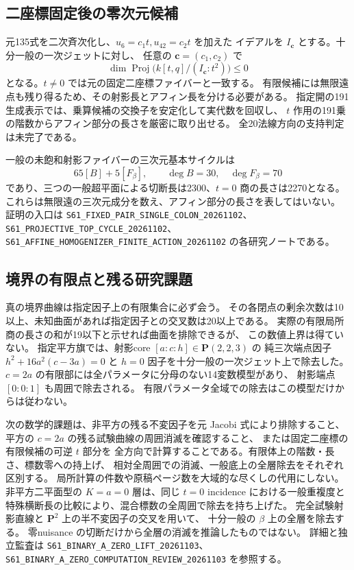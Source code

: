 \documentclass[11pt,a4paper]{ltjsarticle}
\theoremstyle{remark}\newtheorem{remark}[proposition]{注意}
\begin{document}
\subsection{二座標固定後の零次元候補}
元135式を二次斉次化し、$u_6=c_1t,u_{42}=c_2t$ を加えた
イデアルを $I_{\mathbf c}$ とする。十分一般の一次ジェットに対し、
任意の $\mathbf c=(c_1,c_2)$ で
\[
 \dim\operatorname{Proj}\bigl(k[t,q]/(I_{\mathbf c}:t^2)\bigr)\le0
\]
となる。$t\ne0$ では元の固定二座標ファイバーと一致する。
有限候補には無限遠点も残り得るため、その射影長とアフィン長を分ける必要がある。
指定開の191生成表示では、乗算候補の交換子を安定化して実代数を回収し、
$t$ 作用の191乗の階数からアフィン部分の長さを厳密に取り出せる。
全20法線方向の支持判定は未完了である。

一般の未飽和射影ファイバーの三次元基本サイクルは
\[
 65[B]+5[F_\beta],\qquad \deg B=30,\quad\deg F_\beta=70
\]
であり、三つの一般超平面による切断長は2300、$t=0$ 商の長さは2270となる。
これらは無限遠の三次元成分を数え、アフィン部分の長さを表してはいない。
証明の入口は
\texttt{S61\_FIXED\_PAIR\_SINGLE\_COLON\_20261102}、
\texttt{S61\_PROJECTIVE\_TOP\_CYCLE\_20261102}、
\texttt{S61\_AFFINE\_HOMOGENIZER\_FINITE\_ACTION\_20261102}
の各研究ノートである。

\subsection{境界の有限点と残る研究課題}
真の境界曲線は指定因子上の有限集合に必ず会う。
その各閉点の剰余次数は10以上、未知曲面があれば指定因子との交叉数は20以上である。
実際の有限局所商の長さの和が19以下と示せれば曲面を排除できるが、
この数値上界は得ていない。
指定平方旗では、射影core $[a:c:h]\in\mathbf P(2,2,3)$ の
純三次端点因子 $h^2+16a^2(c-3a)=0$ と $h=0$ 因子を十分一般の一次ジェット上で除去した。
$c=2a$ の有限部には全パラメータに分母のない14変数模型があり、
射影端点 $[0:0:1]$ も周囲で除去される。
有限パラメータ全域での除去はこの模型だけからは従わない。

次の数学的課題は、非平方の残る不変因子を元 Jacobi 式により排除すること、
平方の $c=2a$ の残る試験曲線の周囲消滅を確認すること、
または固定二座標の有限候補の可逆 $t$ 部分を
全方向で計算することである。有限体上の階数・長さ、標数零への持上げ、
相対全周囲での消滅、一般底上の全層除去をそれぞれ区別する。
局所計算の件数や原稿ページ数を大域的な尽くしの代用にしない。
非平方二平面型の $K=a=0$ 層は、同じ $t=0$ incidence における一般重複度と
特殊横断長の比較により、混合標数の全周囲で除去を持ち上げた。
完全試験射影直線と $\mathbf P^2$ 上の半不変因子の交叉を用いて、
十分一般の $\beta$ 上の全層を除去する。
零nuisance の切断だけから全層の消滅を推論したものではない。
詳細と独立監査は \texttt{S61\_BINARY\_A\_ZERO\_LIFT\_20261103}、
\texttt{S61\_BINARY\_A\_ZERO\_COMPUTATION\_REVIEW\_20261103} を参照する。
\end{document}
